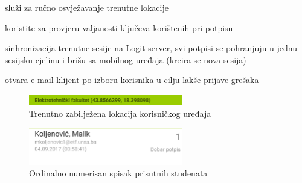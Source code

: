 \begin{description}[noitemsep,align=right,labelwidth=2cm]
    \item [Dugme 1] služi za ručno osvježavanje trenutne lokacije
    \item [Dugme 2] koristite za provjeru valjanosti ključeva korištenih pri potpisu
    \item [Dugme 3] sinhronizacija trenutne sesije na Logit server, svi potpisi se pohranjuju u jednu sesijsku cjelinu i brišu sa mobilnog uređaja (kreira se nova sesija)
    \item [Dugme 4] otvara e-mail klijent po izboru korisnika u cilju lakše prijave grešaka
\end{description}

\begin{figure}[H]
    \centering
    \includegraphics[width=0.6\textwidth]{material/manual/03-geobar}
    \caption{Trenutno zabilježena lokacija korisničkog uređaja}
\end{figure}

\begin{figure}[H]
    \centering
    \includegraphics[width=0.6\textwidth]{material/manual/04-attns}
    \caption{Ordinalno numerisan spisak prisutnih studenata}
\end{figure}